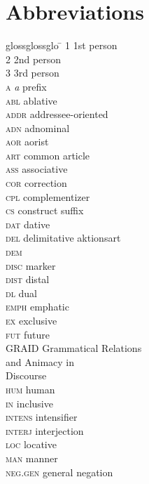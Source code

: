 \documentclass[output=paper
,modfonts
,nonflat]{langsci/langscibook}
\begin{document}
\newpage 
\section*{Abbreviations}

\begin{multicols}{2}
	\begin{tabbing}
		glossglossglo \= \kill
		{1} \> 1st person\\
		{2} \> 2nd person\\
		{3} \> 3rd person\\
		\textsc{a} \> \textit{a} prefix \\
		\textsc{abl} \> ablative\\
		\textsc{addr} \> addressee-oriented\\
		\textsc{adn} \> adnominal\\
		\textsc{aor} \> aorist\\
		\textsc{art} \> common article\\
		\textsc{ass} \> associative\\
		\textsc{cor} \> correction\\
		\textsc{cpl} \> complementizer\\
		\textsc{cs} \> construct suffix\\
		\textsc{dat} \> dative\\
		\textsc{del} \> delimitative aktionsart\\
		\textsc{dem} \> \\
		\textsc{disc} \>  marker\\
		\textsc{dist} \> distal\\
		\textsc{dl} \> dual\\
		\textsc{emph} \> emphatic\\
		\textsc{ex} \> exclusive\\
		\textsc{fut} \> future\\
		GRAID \> Grammatical Relations\\ \> and Animacy in\\ \> Discourse\\
		\textsc{hum} \> human\\
		\textsc{in} \> inclusive\\
		\textsc{intens} \> intensifier\\
		\textsc{interj} \> interjection\\
		\textsc{loc} \> locative\\
		\textsc{man} \> manner\\
		\textsc{neg.gen} \> general negation\\

\end{tabbing}
\end{multicols}
\end{document}

